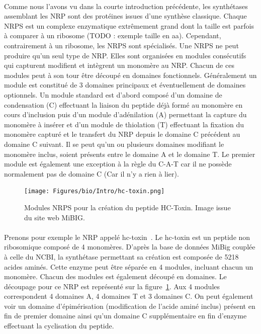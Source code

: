 \documentclass[12pt,french,twoside]{report}
\begin{document}
\paragraph{}Comme nous l'avons vu dans la courte introduction précédente, les synthétases assemblant les NRP sont des protéines issues d'une synthèse classique.
Chaque NRPS est un complexe enzymatique extrêmement grand dont la taille est parfois à comparer à un ribosome (TODO : exemple taille en aa).
Cependant, contrairement à un ribosome, les NRPS sont spécialisés.
Une NRPS ne peut produire qu'un seul type de NRP.
Elles sont organisées en modules consécutifs qui capturent modifient et intègrent un monomère au NRP\cite{schwarzer_nonribosomal_2003,marahiel_modular_1997}.
Chacun de ces modules peut à son tour être découpé en domaines fonctionnels.
Généralement un module est constitué de 3 domaines principaux et éventuellement de domaines optionnels\cite{finking_biosynthesis_2004}.
Un module standard est d'abord composé d'un domaine de condensation (C) effectuant la liaison du peptide déjà formé au monomère en cours d'inclusion puis d'un module d'adénilation (A) permettant la capture du monomère à insérer et d'un module de thiolation (T) effectuant la fixation du monomère capturé et le transfert du NRP depuis le domaine C précédent au domaine C suivant.
Il se peut qu'un ou plusieurs domaines modifiant le monomère inclus, soient présents entre le domaine A et le domaine T.
Le premier module est également une exception à la règle du C-A-T car il ne possède normalement pas de domaine C (Car il n'y a rien à lier).

\begin{figure}[h!]
  \begin{center}
    \texttt{[image: Figures/bio/Intro/hc-toxin.png]}
    \caption{\label{mibig_hc}Modules NRPS pour la création du peptide HC-Toxin.
    Image issue du site web MiBIG.}
  \end{center}
\end{figure}

\paragraph{}Prenons pour exemple le NRP appelé hc-toxin~\cite{_mibig:_????}.
Le hc-toxin est un peptide non ribosomique composé de 4 monomères.
D'après la base de données MiBig couplée à celle du NCBI, la synthétase permettant sa création est composée de 5218 acides aminés.
Cette enzyme peut être séparée en 4 modules, incluant chacun un monomère.
Chacun des modules est également découpé en domaines.
Le découpage pour ce NRP est représenté sur la figure~\ref{mibig_hc}.
Aux 4 modules correspondent 4 domaines A, 4 domaines T et 3 domaines C.
On peut également voir un domaine d'épimérisation (modification de l'acide aminé inclus) présent en fin de premier domaine ainsi qu'un domaine C supplémentaire en fin d'enzyme effectuant la cyclisation du peptide.
\end{document}
